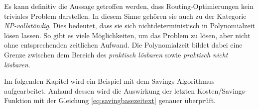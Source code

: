 \noindent
Es kann definitiv die Aussage getroffen werden, dass Routing-Optimierungen kein triviales Problem darstellen. 
In diesem Sinne gehören sie auch zu der Kategorie \textit{NP-vollständig}. 
Dies bedeutet, dass sie sich nichtdeterministisch in Polynomialzeit lösen lassen. 
So gibt es viele Möglichkeiten, um das Problem zu lösen, aber nicht ohne entsprechenden zeitlichen Aufwand. 
Die Polynomialzeit bildet dabei eine Grenze zwischen dem Bereich des \textit{praktisch lösbaren} sowie \textit{praktisch nicht lösbaren}. \newline

\noindent
Im folgenden Kapitel wird ein Beispiel mit dem Savings-Algorithmus aufgearbeitet. 
Anhand dessen wird die Auswirkung der letzten Kosten/Savings-Funktion mit der Gleichung \ref{eq:savingbasezeitext} genauer überprüft. 